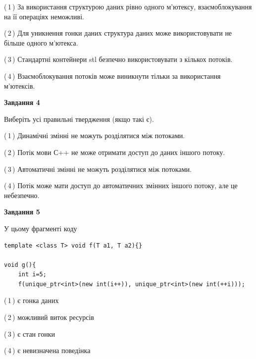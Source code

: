 \documentclass[12pt, ukrainian]{article}
\begin{document}
\begin {large}
{(\,1\,) За використання структурою даних рівно одного м’ютексу, взаємоблокування на її операціях неможливі.%

(\,2\,) Для уникнення гонки даних структура даних може використовувати не більше одного м’ютекса.%

(\,3\,) Стандартні контейнери stl безпечно використовувати з кількох потоків.%

(\,4\,) Взаємоблокування потоків може виникнути тільки за використання м’ютексів.%



\begin{center}
\textbf{Завдання 4}
\end{center}
Виберіть усі правильні твердження (якщо такі є).\par
\vspace{2mm}

(\,1\,) Динамічні змінні не можуть розділятися між потоками.%

(\,2\,) Потік мови С++ не може отримати доступ до даних іншого потоку.%

(\,3\,) Автоматичні змінні не можуть розділятися між потоками.%

(\,4\,) Потік може мати доступ до автоматичних змінних іншого потоку, але це небезпечно.%



\begin{center}
\textbf{Завдання 5}
\end{center}
У цьому фрагменті коду
\begin{verbatim}
template <class T> void f(T a1, T a2){}

void g(){
    int i=5;
    f(unique_ptr<int>(new int(i++)), unique_ptr<int>(new int(++i)));
\end{verbatim}

(\,1\,) є гонка даних%

(\,2\,) можливий виток ресурсів%

(\,3\,) є стан гонки%

(\,4\,) є невизначена поведінка%


}
\end {large}
\end{document}
